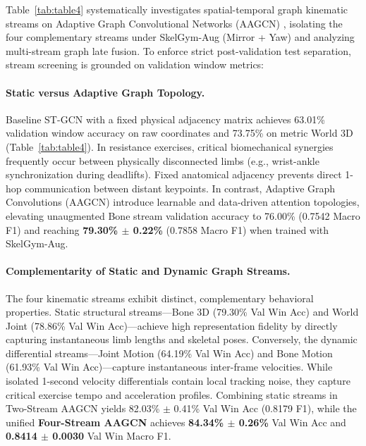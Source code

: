 \documentclass[preprint,12pt]{elsarticle}
\begin{document}
Table~\ref{tab:table4} systematically investigates spatial-temporal graph kinematic streams on Adaptive Graph Convolutional Networks (AAGCN) \cite{shi2020skeleton}, isolating the four complementary streams under SkelGym-Aug (Mirror + Yaw) and analyzing multi-stream graph late fusion. To enforce strict post-validation test separation, stream screening is grounded on validation window metrics:

\paragraph{Static versus Adaptive Graph Topology.} Baseline ST-GCN \cite{yan2018} with a fixed physical adjacency matrix achieves 63.01\% validation window accuracy on raw coordinates and 73.75\% on metric World 3D (Table~\ref{tab:table4}). In resistance exercises, critical biomechanical synergies frequently occur between physically disconnected limbs (e.g., wrist-ankle synchronization during deadlifts). Fixed anatomical adjacency prevents direct 1-hop communication between distant keypoints. In contrast, Adaptive Graph Convolutions (AAGCN) introduce learnable and data-driven attention topologies, elevating unaugmented Bone stream validation accuracy to 76.00\% (0.7542 Macro F1) and reaching \textbf{79.30\% $\pm$ 0.22\%} (0.7858 Macro F1) when trained with SkelGym-Aug.

\paragraph{Complementarity of Static and Dynamic Graph Streams.} The four kinematic streams exhibit distinct, complementary behavioral properties. Static structural streams---Bone 3D (79.30\% Val Win Acc) and World Joint (78.86\% Val Win Acc)---achieve high representation fidelity by directly capturing instantaneous limb lengths and skeletal poses. Conversely, the dynamic differential streams---Joint Motion (64.19\% Val Win Acc) and Bone Motion (61.93\% Val Win Acc)---capture instantaneous inter-frame velocities. While isolated 1-second velocity differentials contain local tracking noise, they capture critical exercise tempo and acceleration profiles. Combining static streams in Two-Stream AAGCN yields 82.03\% $\pm$ 0.41\% Val Win Acc (0.8179 F1), while the unified \textbf{Four-Stream AAGCN} achieves \textbf{84.34\% $\pm$ 0.26\%} Val Win Acc and \textbf{0.8414 $\pm$ 0.0030} Val Win Macro F1.
\end{document}
